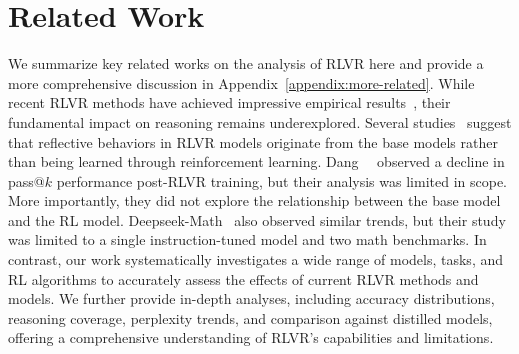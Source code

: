 \vspace{-0.5mm}
\section{Related Work}
\vspace{-0.5mm}

We summarize key related works on the analysis of RLVR here and provide a more comprehensive discussion in Appendix~\ref{appendix:more-related}.
While recent RLVR methods have achieved impressive empirical results~\cite{guo2025deepseek-r1, lambert2024tulu3}, their fundamental impact on reasoning remains underexplored. 
Several studies~\cite{liu2025there, zhao2025echo, shah2025rethinking} suggest that reflective behaviors in RLVR models originate from the base models rather than being learned through reinforcement learning. Dang~\etal~\cite{dang2025assessing} observed a decline in pass@$k$ performance post-RLVR training, but their analysis was limited in scope. 
More importantly, they did not explore the relationship between the base model and the RL model.
Deepseek-Math~\cite{shao2024deepseekmath} also observed similar trends, but their study was limited to a single instruction-tuned model and two math benchmarks.
In contrast, our work systematically investigates a wide range of models, tasks, and RL algorithms to accurately assess the effects of current RLVR methods and models. We further provide in-depth analyses, including accuracy distributions, reasoning coverage, perplexity trends, and comparison against distilled models, offering a comprehensive understanding of RLVR's capabilities and limitations.
